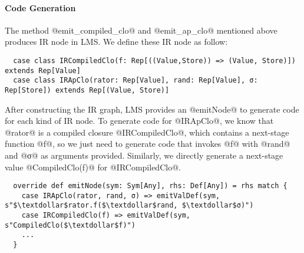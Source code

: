 \paragraph{Code Generation}

The method @emit_compiled_clo@ and @emit_ap_clo@ mentioned above produces IR
node in LMS. We define these IR node as follow: 

\begin{lstlisting}
  case class IRCompiledClo(f: Rep[((Value,Store)) => (Value, Store)]) extends Rep[Value]
  case class IRApClo(rator: Rep[Value], rand: Rep[Value], σ: Rep[Store]) extends Rep[(Value, Store)]
\end{lstlisting}

After constructing the IR graph, LMS provides an @emitNode@ to generate code for
each kind of IR node. To generate code for @IRApClo@, we know that @rator@ is a
compiled closure @IRCompiledClo@, which contains a next-stage function @f@, so
we just need to generate code that invokes @f@ with @rand@ and @σ@ as arguments
provided. Similarly, we directly generate a next-stage value @CompiledClo(f)@
for @IRCompiledClo@.

\begin{lstlisting}
  override def emitNode(sym: Sym[Any], rhs: Def[Any]) = rhs match {
    case IRApClo(rator, rand, σ) => emitValDef(sym, s"$\textdollar$rator.f($\textdollar$rand, $\textdollar$σ)")
    case IRCompiledClo(f) => emitValDef(sym, s"CompiledClo($\textdollar$f)")
    ...
  }
\end{lstlisting}
